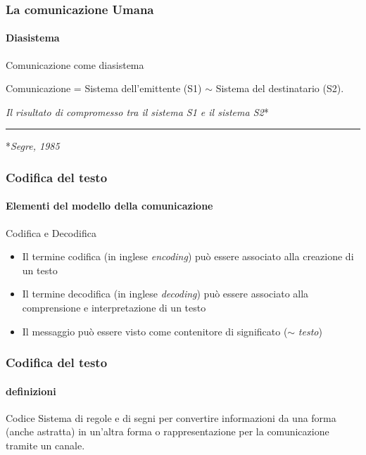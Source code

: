\begin{frame}
	\frametitle{La comunicazione Umana}
	\framesubtitle{Diasistema}
	\addtocounter{nframe}{1}

	\begin{block}{Comunicazione come diasistema}
		\begin{center}Comunicazione = Sistema dell'emittente (S1) $\sim$  Sistema del destinatario (S2).\end{center}
		\textit{Il risultato di compromesso tra il sistema S1 e il sistema S2}*
	\end{block}

	\rule{8cm}{0.05cm}
	*\textit{Segre, 1985}
\end{frame}

\begin{frame}
	\frametitle{Codifica del testo}
	\framesubtitle{Elementi del modello della comunicazione}
	\addtocounter{nframe}{1}

	\begin{block}{Codifica e Decodifica}
		\begin{itemize}
			\item Il termine codifica (in inglese \textit{encoding}) può essere associato alla creazione di un testo
			\item Il termine decodifica (in inglese \textit{decoding}) può essere associato alla comprensione e interpretazione di un testo
			\item Il messaggio può essere visto come contenitore di significato ($\sim$ \textit{testo})
		\end{itemize}
	\end{block}

\end{frame}

\begin{frame}
	\frametitle{Codifica del testo}
	\framesubtitle{definizioni}
	\addtocounter{nframe}{1}

	\begin{block}{Codice}
		Sistema di regole e di segni per convertire informazioni da una forma (anche astratta) in un'altra forma o rappresentazione per la comunicazione tramite un canale.
	\end{block}

\end{frame}

